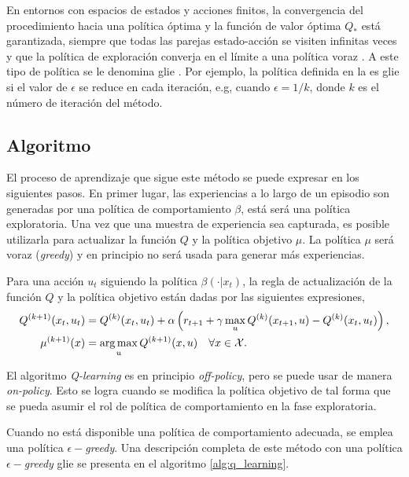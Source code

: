 En entornos con espacios de estados y acciones finitos, la convergencia del procedimiento hacia una política óptima y la función de valor óptima $Q_*$ está garantizada, siempre que todas las parejas estado-acción se visiten infinitas veces y que la política de exploración converja en el límite a una política voraz \cite{Sutton2018}. A este tipo de política se le denomina \acrfull{glie} \cite{rao_rl_control_tour}. Por ejemplo, la política definida en la  es \acrshort{glie} si el valor de $\epsilon$ se reduce en cada iteración, e.g, cuando $\epsilon = 1/k$, donde $k$ es el número de iteración del método. 

\subsection{Algoritmo}

El proceso de aprendizaje que sigue este método se puede expresar en los siguientes pasos. En primer lugar, las experiencias a lo largo de un episodio son generadas por una política de comportamiento $\beta$, está será una política exploratoria. Una vez que una muestra de experiencia sea capturada, es posible utilizarla para actualizar la función $Q$ y la política objetivo $\mu$. La política $\mu$ será voraz (\textit{greedy}) y en principio no será usada para generar más experiencias.

Para una acción $u_t$ siguiendo la política $\beta(\cdot|x_t)$, la regla de actualización de la función $Q$ y la política objetivo están dadas por las siguientes expresiones,
\begin{align}
    Q^{(k+1)}(x_t, u_t) &= Q^{(k)}(x_t, u_t) + \alpha \left( r_{t+1} + \gamma \max_{u}Q^{(k)}(x_{t+1}, u) - Q^{(k)}(x_t, u_t)\right), \\
    \mu^{(k+1)}(x)&= \operatorname*{arg\,max}_{u} Q^{(k+1)}(x, u) \quad \forall x \in \mathcal{X}.
\end{align}

El algoritmo \textit{Q-learning} es en principio \textit{off-policy}, pero se puede usar de manera \textit{on-policy}. Esto se logra cuando se modifica la política objetivo de tal forma que se pueda asumir el rol de política de comportamiento en la fase exploratoria.

Cuando no está disponible una política de comportamiento adecuada, se emplea una política $\epsilon-$\textit{greedy}. Una descripción completa de este método con una política $\epsilon-$\textit{greedy} \acrshort{glie} se presenta en el algoritmo \ref{alg:q_learning}.

